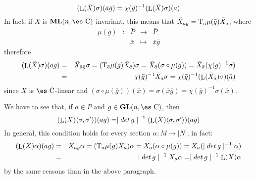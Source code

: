 \documentclass[12pt]{article}
\theoremstyle{plain}
\def\beann{\begin{eqnarray*}}
\def\eeann{\end{eqnarray*}}
\def\GL{{\bf GL}(n,\Complex )}
\def\ML{{\bf ML}(n,\Complex )}
\def\Complex{\mbox{\es C}}
\def\Tan{{\rm T}}
\def\Lie{\mathop{\rm L}\nolimits}
\begin{document}
$$
(\Lie(\bar X) \sigma )(\bar a \bar g) =
\chi (\bar g)^{-1} (\Lie(\bar X) \sigma )(a)
$$
In fact, if $\bar X$ is $\ML$-invariant, this means that
$\bar X_{\bar a \bar g} = \Tan_{\bar a} \mu (\bar g) \bar X_{\bar a}$,
where
$$
\begin{array}{ccccc}
\mu (\bar g) &:& \bar P & \to & \bar P
\\
& & \bar x & \mapsto & \bar x \bar g
\end{array}
$$
therefore
\beann
(\Lie(\bar X) \sigma )(\bar a \bar g)
&=&
\bar X_{\bar a \bar g} \sigma =
(\Tan_{\bar a} \mu (\bar g) \bar X_{\bar a}) \sigma =
\bar X_{\bar a} (\sigma \circ \mu (\bar g)) =
\bar X_{\bar a} (\chi (\bar g)^{-1}\sigma )
\\ &=&
\chi (\bar g)^{-1} \bar X_{\bar a} \sigma =
\chi (\bar g)^{-1} (\Lie(\bar X_{\bar a})\sigma)(\bar a)
\eeann
since $X$ is $\Complex$-linear and
$(\sigma \circ \mu (\bar g))(\bar x) =
\sigma (\bar x \bar g) = \chi (\bar g)^{-1}\sigma (\bar x)$.

\quad {} \quad
We have to see that, if $a \in P$ and $g \in \GL$, then
$$
(\Lie(X) \langle \sigma ,\sigma ' \rangle)(ag) =
\mid det\, g \mid^{-1} (\Lie(\bar X) \langle \sigma ,\sigma '
\rangle)(ag)
$$
In general, this condition holds for every section
$\alpha : M \to | N |$; in fact:
\beann
(\Lie(X)\alpha)(ag) & = & X_{ag} \alpha = (\Tan_a \mu (g) X_a) \alpha =
X_a (\alpha \circ \mu (g)) =X_a (\mid det\, g \mid^{-1} \alpha )
\\ & = &
\mid det\, g \mid^{-1} X_a \alpha = \mid det\, g \mid^{-1} \Lie(X)
\alpha \eeann by the same reasons than in the above paragraph.
\end{document}

